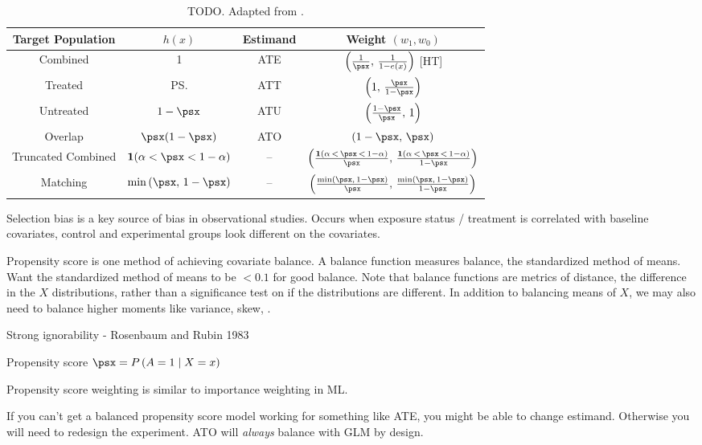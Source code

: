 \begin{table}[H]
  \centering
  \begin{tabular}{c c c c}
  \hline
  Target Population & $h(x)$ & Estimand & Weight $(w_1, w_0)$ \\
  \hline
  \hline
  Combined & 1 & ATE & $\left(\frac{1}{\psx},\, \frac{1}{1-e\left(x\right)}\right)$ [HT] \\
  Treated & \ps & ATT & $\left(1,\, \frac{\psx}{1-\psx}\right)$ \\
  Untreated & $1-\psx$ & ATU & $\left(\frac{1-\psx}{\psx},\, 1\right)$ \\
  Overlap & $\psx(1-\psx)$ & ATO & $(1-\psx,\, \psx)$ \\
  Truncated Combined & $\mathbf{1}(\alpha < \psx < 1-\alpha)$ & -- & $\left(\frac{\mathbf{1}(\alpha \, < \, \psx \, < \, 1-\alpha)}{\psx},\, \frac{\mathbf{1}(\alpha \, < \, \psx \, < \, 1-\alpha)}{1-\psx}\right)$ \\
  Matching & $\min\left(\psx,\, 1-\psx\right)$ & -- & $\left(\frac{\min\left(\psx,\, 1-\psx\right)}{\psx},\, \frac{\min\left(\psx,\, 1-\psx\right)}{1-\psx}\right)$\\
  \hline
  \end{tabular}
  \caption{TODO. Adapted from \cite{Li_2017}.}
  \label{table:cause:ps_weights}
\end{table}

Selection bias is a key source of bias in observational studies.
Occurs when exposure status / treatment is correlated with baseline covariates,
\ie control and experimental groups look different on the covariates.

Propensity score is one method of achieving covariate balance.
A balance function measures balance, \eg the standardized method of means.
Want the standardized method of means to be $< 0.1$ for good balance.
Note that balance functions are metrics of distance, \ie the difference in the $X$ distributions,
rather than a significance test on if the distributions are different.
In addition to balancing means of $X$, we may also need to balance higher moments like variance, skew, \etc.

Strong ignorability - Rosenbaum and Rubin 1983

Propensity score $\psx = P\left(A=1 \mid X = x\right)$

Propensity score weighting is similar to importance weighting in ML.

If you can't get a balanced propensity score model working for something like ATE, you might be able to change estimand.
Otherwise you will need to redesign the experiment.
ATO will \emph{always} balance with GLM by design.


